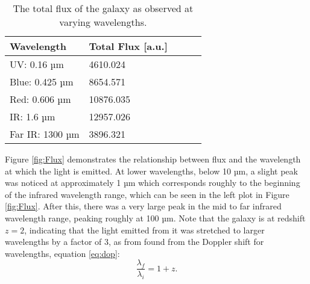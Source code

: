 \documentclass[10pt, preprint]{aastex}
\begin{document}
\begin{table}[H]
    \centering
    \begin{tabular}{lllll}
        \hline
         Wavelength             & Total Flux [a.u.]     \\\hline
         UV: 0.16 µm            & 4610.024              \\
         Blue: 0.425 µm & 8654.571              \\
         Red: 0.606 µm          & 10876.035             \\
         IR: 1.6 µm             & 12957.026             \\
         Far IR: 1300 µm        & 3896.321              \\\hline
    \end{tabular}
    \caption{The total flux of the galaxy as observed at varying wavelengths.}
    \label{tab:totflux}
\end{table}
\vspace{-1\baselineskip}
Figure \ref{fig:Flux} demonstrates the relationship between flux and the wavelength at which the light is emitted. At lower wavelengths, below 10 µm, a slight peak was noticed at approximately 1 µm which corresponds roughly to the beginning of the infrared wavelength range, which can be seen in the left plot in Figure \ref{fig:Flux}. After this, there was a very large peak in the mid to far infrared wavelength range, peaking roughly at 100 µm. Note that the galaxy is at redshift $z=2$, indicating that the light emitted from it was stretched to larger wavelengths by a factor of 3, as from found from the Doppler shift for wavelengths, equation \ref{eq:dop}:
\begin{equation}\label{eq:dop}
    \frac{\lambda_{f}}{\lambda_{i}} = 1+z.
\end{equation}
\vspace{-1\baselineskip}
\end{document}
